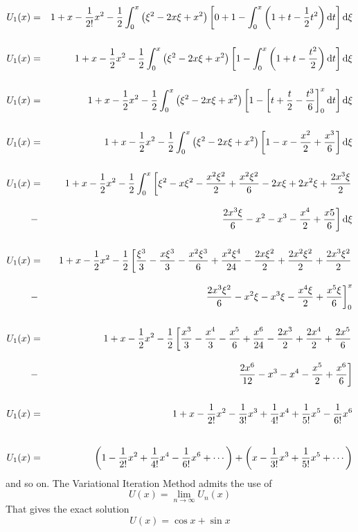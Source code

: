 \documentclass[12pt]{report}
\newcommand{\spn}[1]{\\[#1cm]}
\begin{document}
	\begin{eqnarray}
		U_1(x) &=& 1 + x - \frac{1}{2!}x^2 - \frac{1}{2} \int_0^x \left(\xi^2 - 2x\xi + x^2\right) \left[0 + 1 - \int_0^x \left(1 + t - \frac{1}{2}t^2\right) \text{d}t\right] \text{d}\xi \notag \spn{0.5}
		U_1(x) &=& 1 + x - \frac{1}{2}x^2 - \frac{1}{2} \int_0^x \left(\xi^2 - 2x\xi + x^2\right) \left[1 - \int_0^x \left(1 + t - \frac{t^2}{2}\right) \text{d}t\right] \text{d}\xi \notag \spn{0.5}
		U_1(x) &=& 1 + x - \frac{1}{2}x^2 - \frac{1}{2} \int_0^x \left(\xi^2 - 2x\xi + x^2\right) \left[1 - \left[t + \frac{t}{2} - \frac{t^3}{6}\right]_0^x \text{d}t\right] \text{d}\xi \notag \spn{0.5}
		U_1(x) &=& 1 + x - \frac{1}{2}x^2 - \frac{1}{2} \int_0^x \left(\xi^2 - 2x\xi + x^2\right) \left[1 - x - \frac{x^2}{2} + \frac{x^3}{6}\right] \text{d}\xi \notag \spn{0.5}
		U_1(x) &=& 1 + x - \frac{1}{2}x^2 - \frac{1}{2} \int_0^x \left[\xi^2 - x\xi^2 - \frac{x^2\xi^2}{2} + \frac{x^2\xi^2}{6} - 2x\xi + 2x^2 \xi + \frac{2x^3\xi}{2}  \right. \notag \spn{0.3}
		&-& \left. \frac{2x^3\xi}{6} -x^2 - x^3 - \frac{x^4}{2} + \frac{x5}{6}\right] \text{d}\xi \notag \spn{0.5}
		U_1(x) &=& 1 + x - \frac{1}{2}x^2 - \frac{1}{2} \left[\frac{\xi^3}{3} - \frac{x\xi^3}{3} - \frac{x^2\xi^3}{6} + \frac{x^2\xi^4}{24} - \frac{2x\xi^2}{2} + \frac{2x^2 \xi^2}{2} + \frac{2x^3\xi^2}{2}  \right. \notag \spn{0.3}
		&-& \left. \frac{2x^3\xi^2}{6} -x^2\xi - x^3\xi - \frac{x^4\xi}{2} + \frac{x^5\xi}{6}\right]_0^x \notag \spn{0.5}
		U_1(x) &=& 1 + x - \frac{1}{2}x^2 - \frac{1}{2} \left[\frac{x^3}{3} - \frac{x^4}{3} - \frac{x^5}{6} + \frac{x^6}{24} - \frac{2x^3}{2} + \frac{2x^4}{2} + \frac{2x^5}{6}  \right. \notag \spn{0.3}
		&-& \left. \frac{2x^6}{12} -x^3 - x^4 - \frac{x^5}{2} + \frac{x^6}{6}\right] \notag \spn{0.5}
		U_1(x) &=& 1 + x - \frac{1}{2!}x^2 - \frac{1}{3!}x^3 + \frac{1}{4!}x^4 + \frac{1}{5!}x^5 - \frac{1}{6!}x^6 \notag \spn{0.7}
		U_1(x) &=& \left(1- \frac{1}{2!}x^2+ \frac{1}{4!}x^4- \frac{1}{6!}x^6 + \cdots\right) + \left(x- \frac{1}{3!}x^3+ \frac{1}{5!}x^5 + \cdots\right) \notag
	\end{eqnarray}
	\newpage
	and so on. The Variational Iteration Method admits the use of 
	\begin{equation*}
		U(x) = \lim\limits_{n\rightarrow \infty}U_n(x)
	\end{equation*}
	That gives the exact solution
	\begin{equation}
		U(x) = \cos x + \sin x
	\end{equation}
	
	
\end{document}
